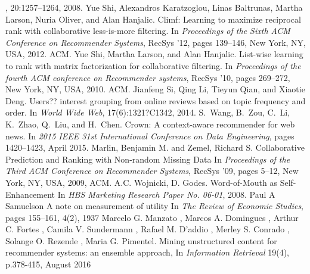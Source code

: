 \documentclass{llncs}
\begin{document}
\begin{thebibliography}{10}
,
20:1257--1264, 2008.
Yue Shi, Alexandros Karatzoglou, Linas Baltrunas, Martha Larson, Nuria Oliver,
and Alan Hanjalic.
\newblock Climf: Learning to maximize reciprocal rank with collaborative
less-is-more filtering.
\newblock In {\em Proceedings of the Sixth ACM Conference on Recommender
Systems}, RecSys '12, pages 139--146, New York, NY, USA, 2012. ACM.
Yue Shi, Martha Larson, and Alan Hanjalic.
\newblock List-wise learning to rank with matrix factorization for
collaborative filtering.
\newblock In {\em Proceedings of the fourth ACM conference on Recommender
systems}, RecSys '10, pages 269--272, New York, NY, USA, 2010. ACM.
Jianfeng Si, Qing Li, Tieyun Qian, and Xiaotie Deng.
\newblock Users?? interest grouping from online reviews based on topic
frequency and order.
\newblock In {\em World Wide Web}, 17(6):1321?C1342, 2014.
S.~Wang, B.~Zou, C.~Li, K.~Zhao, Q.~Liu, and H.~Chen.
\newblock Crown: A context-aware recommender for web news.
\newblock In {\em 2015 IEEE 31st International Conference on Data Engineering},
pages 1420--1423, April 2015.
Marlin, Benjamin M. and Zemel, Richard S.
\newblock Collaborative Prediction and Ranking with Non-random Missing Data
\newblock In {\em Proceedings of the Third ACM Conference on Recommender Systems}, RecSys '09, pages 5--12, New York, NY, USA, 2009, ACM.
\newblock A.C. Wojnicki, D. Godes.
\newblock Word-of-Mouth as Self-Enhancement
\newblock In {\em HBS Marketing Research Paper No.
06-01}, 2008.
\newblock Paul A Samuelson
\newblock A note on measurement of utility
\newblock In {\em The Review of Economic Studies}, pages 155--161, 4(2), 1937
\newblock Marcelo G. Manzato , Marcos A. Domingues , Arthur C. Fortes , Camila V. Sundermann , Rafael M. D'addio , Merley S. Conrado , Solange O. Rezende , Maria G. Pimentel.
\newblock Mining unstructured content for recommender systems: an ensemble approach,
\newblock In {\em Information Retrieval} 19(4), p.378-415, August 2016

\end{thebibliography}
\end{document}
